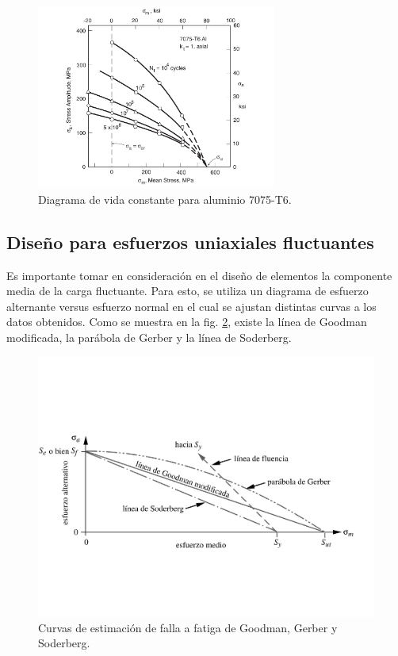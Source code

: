 \begin{figure}[h]
\centering
\includegraphics[width=0.7\textwidth]{Imagenes/diag_cfl.pdf}
\caption{Diagrama de vida constante para aluminio 7075-T6. \cite{dowling2013mechanical}}
\label{fig:diag_cfl}
\end{figure}

\newpage

\subsection{Diseño para esfuerzos uniaxiales fluctuantes}
Es importante tomar en consideración en el diseño de elementos la componente media de la carga fluctuante. Para esto, se utiliza un diagrama de esfuerzo alternante versus esfuerzo normal en el cual se ajustan distintas curvas a los datos obtenidos. Como se muestra en la fig. \ref{fig:falla_fat}, existe la línea de Goodman modificada, la parábola de Gerber y la línea de Soderberg. 

\begin{figure}[h]
\centering
\includegraphics[width=0.8\linewidth, trim={0cm 4.5cm 0cm 5.5cm},clip]{Imagenes/falla_fat.pdf}
\caption{Curvas de estimación de falla a fatiga de Goodman, Gerber y Soderberg.\cite{norton2011machine}}
\label{fig:falla_fat}
\end{figure}

